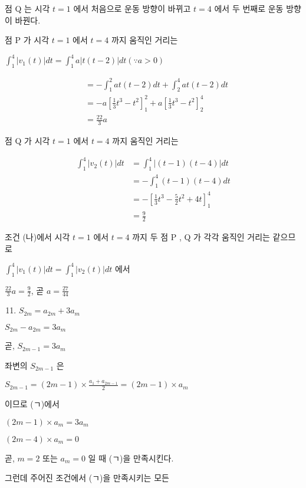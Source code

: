 \documentclass[10pt]{article}
\begin{document}
점 Q 는 시각 \(t=1\) 에서 처음으로 운동 방향이 바뀌고 \(t=4\) 에서 두 번째로 운동 방향이 바꿘다.

점 P 가 시각 \(t=1\) 에서 \(t=4\) 까지 움직인 거리는

\(\int_{1}^{4}\left|v_{1}(t)\right| d t=\int_{1}^{4} a|t(t-2)| d t(\because a>0)\)

\[
\begin{aligned}
& =-\int_{1}^{2} a t(t-2) d t+\int_{2}^{4} a t(t-2) d t \\
& =-a\left[\frac{1}{3} t^{3}-t^{2}\right]_{1}^{2}+a\left[\frac{1}{3} t^{3}-t^{2}\right]_{2}^{4} \\
& =\frac{22}{3} a
\end{aligned}
\]

점 Q 가 시각 \(t=1\) 에서 \(t=4\) 까지 움직인 거리는

\[
\begin{aligned}
\int_{1}^{4}\left|v_{2}(t)\right| d t & =\int_{1}^{4}|(t-1)(t-4)| d t \\
& =-\int_{1}^{4}(t-1)(t-4) d t \\
& =-\left[\frac{1}{3} t^{3}-\frac{5}{2} t^{2}+4 t\right]_{1}^{4} \\
& =\frac{9}{2}
\end{aligned}
\]

조건 (나)에서 시각 \(t=1\) 에서 \(t=4\) 까지 두 점 P , Q 가 각각 움직인 거리는 같으므로

\(\int_{1}^{4}\left|v_{1}(t)\right| d t=\int_{1}^{4}\left|v_{2}(t)\right| d t\) 에서

\(\frac{22}{3} a=\frac{9}{2}\), 곧 \(a=\frac{27}{44}\)

\begin{enumerate}
  \setcounter{enumi}{10}
  \item \(S_{2 m}=a_{2 m}+3 a_{m}\)
\end{enumerate}

\(S_{2 m}-a_{2 m}=3 a_{m}\)

곧, \(S_{2 m-1}=3 a_{m}\)

좌변의 \(S_{2 m-1}\) 은

\(S_{2 m-1}=(2 m-1) \times \frac{a_{1}+a_{2 m-1}}{2}=(2 m-1) \times a_{m}\)

이므로 (ㄱ)에서

\((2 m-1) \times a_{m}=3 a_{m}\)

\((2 m-4) \times a_{m}=0\)

곧, \(m=2\) 또는 \(a_{m}=0\) 일 때 (ㄱ)을 만족시킨다.

그런데 주어진 조건에서 (ㄱ)을 만족시키는 모든
\end{document}
